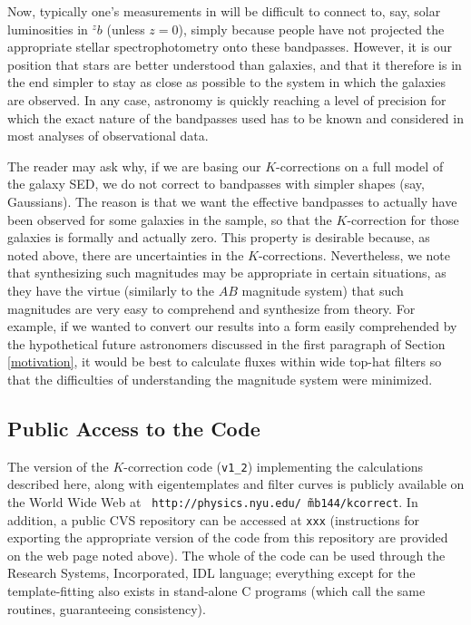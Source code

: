\documentclass[10pt,preprint]{aastex}
\newcommand{\band}[2]{\ensuremath{^{#1}{#2}}}
\begin{document}
Now, typically one's measurements in will be difficult to connect to,
say, solar luminosities in $\band{z}{b}$ (unless $z=0$), simply
because people have not projected the appropriate stellar
spectrophotometry onto these bandpasses. However, it is our position
that stars are better understood than galaxies, and that it therefore
is in the end simpler to stay as close as possible to the system in
which the galaxies are observed. In any case, astronomy is quickly
reaching a level of precision for which the exact nature of the
bandpasses used has to be known and considered in most analyses of
observational data.

The reader may ask why, if we are basing our $K$-corrections on a full
model of the galaxy SED, we do not correct to bandpasses with simpler
shapes (say, Gaussians). The reason is that we want the effective
bandpasses to actually have been observed for some galaxies in the
sample, so that the $K$-correction for those galaxies is formally and
actually zero. This property is desirable because, as noted above,
there are uncertainties in the $K$-corrections. Nevertheless, we note
that synthesizing such magnitudes may be appropriate in certain
situations, as they have the virtue (similarly to the $AB$ magnitude
system) that such magnitudes are very easy to comprehend and
synthesize from theory. For example, if we wanted to convert our
results into a form easily comprehended by the hypothetical future
astronomers discussed in the first paragraph of Section
\ref{motivation}, it would be best to calculate fluxes within wide
top-hat filters so that the difficulties of understanding the
magnitude system were minimized.

\subsection{Public Access to the Code}

The version of the $K$-correction code ({\tt v1\_2}) implementing the
calculations described here, along with eigentemplates and filter
curves is publicly available on the World Wide Web at {\tt
http://physics.nyu.edu/\~\ mb144/kcorrect}. In addition, a public CVS
repository can be accessed at {\tt xxx} (instructions for exporting
the appropriate version of the code from this repository are provided
on the web page noted above). The whole of the code can be used
through the Research Systems, Incorporated, IDL language; everything
except for the template-fitting also exists in stand-alone C programs
(which call the same routines, guaranteeing consistency).
\end{document}
